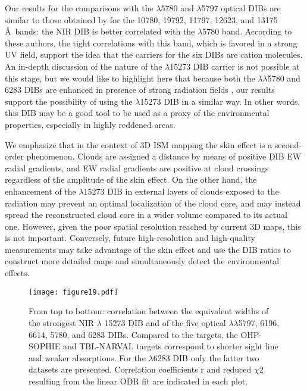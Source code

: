 \documentclass[printer]{aa} %
\begin{document}
Our results for the comparisons with the $\lambda$5780 and $\lambda$5797 optical DIBs are similar to those obtained by \cite{Hamano15,Hamano16} for the 10780, 19792, 11797, 12623, and 13175 \AA\ bands: the NIR DIB is better correlated with the $\lambda$5780 band. According to these authors, the tight correlations with this band, which is favored in a strong UV field, support the idea that the carriers for the six DIBs are cation molecules.
An in-depth discussion of the nature of the $\lambda$15273 DIB carrier is not possible at this stage, but we would like to highlight here that because both the  $\lambda\lambda$5780 and 6283 DIBs are enhanced in presence of strong radiation fields \citep[][]{Ehrenfreund95,Cami97,Vos11}, our results support the possibility of using the $\lambda$15273 DIB in a similar way. In other words, this DIB may be a good tool to be used as a proxy of the environmental properties, especially in highly reddened areas. 
 
We emphasize that in the context of 3D ISM mapping the skin effect is a second-order phenomenon. Clouds are assigned a distance by means of positive DIB EW radial gradients, and EW radial gradients are positive at cloud crossings regardless
of the amplitude of the skin effect. On the other hand, the enhancement of the $\lambda$15273 DIB in external layers of clouds exposed to the radiation may prevent an optimal localization of the cloud core, and may instead spread the reconstructed cloud core in a wider volume compared to its actual one. However, given the poor spatial resolution reached by current 3D maps, this is not important. Conversely, future high-resolution and high-quality measurements may take advantage of the skin effect and use the DIB ratios to construct more detailed maps and simultaneously detect the environmental effects.
\begin{figure*}[!htb]
\centering
\texttt{[image: figure19.pdf]}\caption{\label{correlation2} From top to bottom: correlation between the equivalent widths of the strongest NIR $\lambda$ 15273 DIB and of the five optical $\lambda\lambda$5797, 6196, 6614, 5780, and 6283 DIBs. Compared to the \cite{Cox14} targets, the OHP-SOPHIE and TBL-NARVAL targets correspond to shorter sight line and weaker absorptions. For the $\lambda$6283 DIB only the latter two datasets are presented. Correlation coefficients r and reduced $\chi{2}$ resulting from the linear ODR fit are indicated in each plot.}
\end{figure*}
\end{document}
